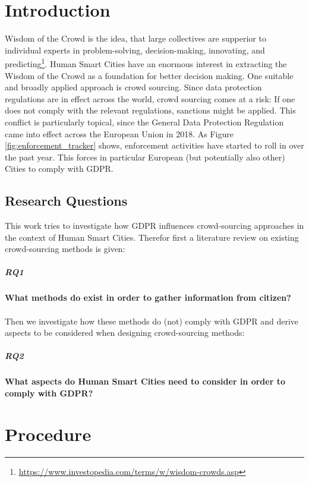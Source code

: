 \documentclass[a4paper,12pt]{report}
\begin{document}
	\tableofcontents
	
	\chapter{Introduction}
	Wisdom of the Crowd is the idea, that large collectives are supperior to individual experts in problem-solving, decision-making, innovating, and predicting\footnote{\url{https://www.investopedia.com/terms/w/wisdom-crowds.asp}}. 
	Human Smart Cities have an enormous interest in extracting the Wisdom of the Crowd as a foundation for better decision making.
	One suitable and broadly applied approach is crowd sourcing.
	Since data protection regulations are in effect across the world, crowd sourcing comes at a risk: If one does not comply with the relevant regulations, sanctions might be applied.
	This conflict is particularly topical, since the General Data Protection Regulation came into effect across the European Union in 2018.
	As Figure \ref{fig:enforcement_tracker} shows, enforcement activities have started to roll in over the past year. This forces in particular European (but potentially also other) Cities to comply with GDPR.

	\section{Research Questions}
	\startsection
		This work tries to investigate how GDPR influences crowd-sourcing approaches in the context of Human Smart Cities.
		Therefor first a literature review on existing crowd-sourcing methods is given:
		\paragraph{\textbf{RQ1}}\label{para:RQ1}\textbf{What methods do exist in order to gather information from citizen?} \\ \\
		Then we investigate how these methods do (not) comply with GDPR and derive aspects to be considered when designing crowd-sourcing methods:
		\paragraph{\textbf{RQ2}}\label{para:RQ2}\textbf{What aspects do Human Smart Cities need to consider in order to comply with GDPR?}
	\closesection
	
	
	\chapter{Procedure}
	
\end{document}

